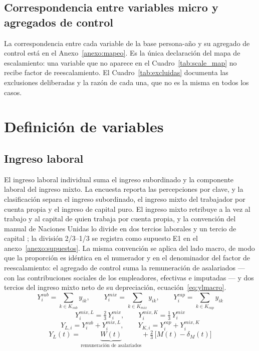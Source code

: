 \documentclass[11pt,a4paper]{article}
\begin{document}
\subsection{Correspondencia entre variables micro y agregados de control}
La correspondencia entre cada variable de la base persona-año y su agregado de control está en
el Anexo~\ref{anexo:mapeo}. Es la única declaración del mapa de escalamiento: una variable que no
aparece en el Cuadro~\ref{tab:scale_map} no recibe factor de reescalamiento. El
Cuadro~\ref{tab:excluidas} documenta las exclusiones deliberadas y la razón de cada una, que no
es la misma en todos los casos.
\section{Definición de variables}
\label{sec:variables}
\subsection{Ingreso laboral}
El ingreso laboral individual suma el ingreso subordinado y la componente laboral del ingreso
mixto. La encuesta reporta las percepciones por clave, y la clasificación separa el ingreso
subordinado, el ingreso mixto del trabajador por cuenta propia y el ingreso de capital puro. El
ingreso mixto retribuye a la vez al trabajo y al capital de quien trabaja por cuenta propia, y la
convención del manual de Naciones Unidas lo divide en dos tercios laborales y un tercio de capital
\citep{un_nta_manual_2013}; la división 2/3--1/3 se registra como supuesto E1 en el
anexo~\ref{anexo:supuestos}. La misma convención se aplica del lado macro, de modo que la
proporción es idéntica en el numerador y en el denominador del factor de reescalamiento: el
agregado de control suma la remuneración de asalariados --- con las contribuciones sociales de los
empleadores, efectivas e imputadas --- y dos tercios del ingreso mixto neto de su depreciación,
ecuación~\eqref{eq:ylmacro}.
\begin{equation}
\label{eq:yl1}
Y^{sub}_i = \sum_{k \in K_{sub}} y_{ik}, \qquad
Y^{mix}_i = \sum_{k \in K_{mix}} y_{ik}, \qquad
Y^{cap}_i = \sum_{k \in K_{cap}} y_{ik}
\end{equation}
\begin{equation}
\label{eq:yl2}
Y^{mix,L}_i = \tfrac{2}{3}\, Y^{mix}_i, \qquad Y^{mix,K}_i = \tfrac{1}{3}\, Y^{mix}_i
\end{equation}
\begin{equation}
\label{eq:yl3}
Y_{L,i} = Y^{sub}_i + Y^{mix,L}_i, \qquad
Y_{K,i} = Y^{cap}_i + Y^{mix,K}_i
\end{equation}
\begin{equation}
\label{eq:ylmacro}
Y_L(t) = \underbrace{W(t)}_{\text{remuneración de asalariados}}
+ \tfrac{2}{3}\,\big[M(t) - \delta_M(t)\big]
\end{equation}
\end{document}
